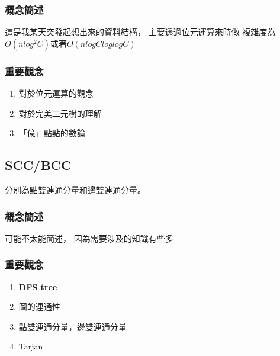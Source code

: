 \documentclass[12pt,oneside]{article}
\begin{document}
\subsubsection*{概念簡述}
這是我某天突發起想出來的資料結構，
主要透過位元運算來時做
複雜度為$O(nlog^2C)$或著$O(nlogC loglogC )$ 
\subsubsection*{重要觀念}
\begin{adjustwidth}{2em}{0em}
\begin{enumerate}
    \item 
        對於位元運算的觀念
    \item 
        對於完美二元樹的理解
    \item 
        「億」點點的數論
\end{enumerate}
\end{adjustwidth}
\clearpage


\subsection{SCC/BCC}
分別為點雙連通分量和邊雙連通分量。

\subsubsection*{概念簡述}
可能不太能簡述，
因為需要涉及的知識有些多
\subsubsection*{重要觀念}
\begin{adjustwidth}{2em}{0em}
\begin{enumerate}
    \item \textbf{DFS tree}
    \item 圖的連通性
    \item 點雙連通分量，邊雙連通分量
    \item Tarjan
\end{enumerate}
\end{adjustwidth}
\end{document}
